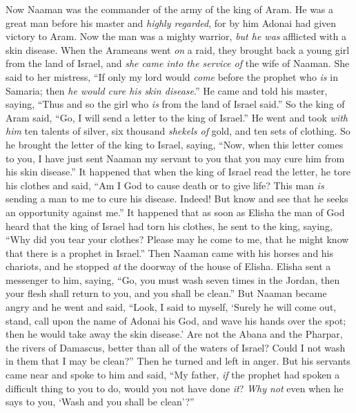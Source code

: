 \begin{biblechapter} %
 Now Naaman was the commander of the army of the king of Aram. He was a great man before his master and \textit{highly regarded}, for by him Adonai had given victory to Aram. Now the man was a mighty warrior, \textit{but he was} afflicted with a skin disease.
\verse When the Arameans went \textit{on} a raid, they brought back a young girl from the land of Israel, and \textit{she came into the service of} the wife of Naaman.
\verse She said to her mistress, “If only my lord would \textit{come} before the prophet who \textit{is} in Samaria; then \textit{he would cure his skin disease}.”
\verse He came and told his master, saying, “Thus and so the girl who \textit{is} from the land of Israel said.”
\verse So the king of Aram said, “Go, I will send a letter to the king of Israel.” He went and took \textit{with him} ten talents of silver, six thousand \textit{shekels of} gold, and ten sets of clothing.
\verse So he brought the letter of the king to Israel, saying, “Now, when this letter comes to you, I have just sent Naaman my servant to you that you may cure him from his skin disease.”
\verse It happened that when the king of Israel read the letter, he tore his clothes and said, “Am I God to cause death or to give life? This man \textit{is} sending a man to me to cure his disease. Indeed! But know and see that he seeks an opportunity against me.”
\verse It happened that as soon as Elisha the man of God heard that the king of Israel had torn his clothes, he sent to the king, saying, “Why did you tear your clothes? Please may he come to me, that he might know that there is a prophet in Israel.”
\verse Then Naaman came with his horses and his chariots, and he stopped \textit{at} the doorway of the house of Elisha.
\verse Elisha sent a messenger to him, saying, “Go, you must wash seven times in the Jordan, then your flesh shall return to you, and you shall be clean.”
\verse But Naaman became angry and he went and said, “Look, I said to myself, ‘Surely he will come out, stand, call upon the name of Adonai his God, and wave his hands over the spot; then he would take away the skin disease.’
\verse Are not the Abana and the Pharpar, the rivers of Damascus, better than all of the waters of Israel? Could I not wash in them that I may be clean?” Then he turned and left in anger.
\verse But his servants came near and spoke to him and said, “My father, \textit{if} the prophet had spoken a difficult thing to you to do, would you not have done \textit{it}? \textit{Why not} even when he says to you, ‘Wash and you shall be clean’?”

\end{biblechapter}
